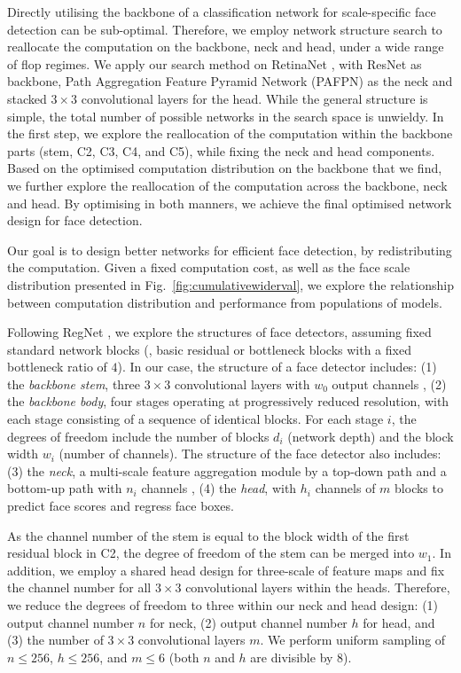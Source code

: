 \documentclass[10pt,twocolumn,letterpaper]{article}
\begin{document}
Directly utilising the backbone of a classification network for scale-specific face detection can be sub-optimal. Therefore, we employ network structure search \cite{radosavovic2020designing} to reallocate the computation on the backbone, neck and head, under a wide range of flop regimes. We apply our search method on RetinaNet \cite{lin2017feature}, with ResNet \cite{he2016deep} as backbone, Path Aggregation Feature Pyramid Network (PAFPN) \cite{liu2018path} as the neck and stacked $3\times3$ convolutional layers for the head. While the general structure is simple, the total number of possible networks in the search space is unwieldy. In the first step, we explore the reallocation of the computation within the backbone parts (\ie stem, C2, C3, C4, and C5), while fixing the neck and head components. Based on the optimised computation distribution on the backbone that we find, we further explore the reallocation of the computation across the backbone, neck and head. By optimising in both manners, we achieve the final optimised network design for face detection.

Our goal is to design better networks for efficient face detection, by redistributing the computation. Given a fixed computation cost, as well as the face scale distribution presented in Fig.~\ref{fig:cumulativewiderval}, we explore the relationship between computation distribution and performance from populations of models. 

Following RegNet \cite{radosavovic2020designing}, we explore the structures of face detectors, assuming fixed standard network blocks (\ie, basic residual or bottleneck blocks with a fixed bottleneck ratio of $4$). In our case, the structure of a face detector includes: (1) the \textit{backbone stem}, three $3\times3$ convolutional layers with $w_0$ output channels \cite{he2019bag}, (2) the \textit{backbone body}, four stages operating at progressively reduced resolution, with each stage consisting of a sequence of identical blocks. For each stage $i$, the degrees of freedom include the number of blocks $d_i$ (\ie network depth) and the block width $w_i$ (\ie number of channels). The structure of the face detector also includes: (3) the \textit{neck}, a multi-scale feature aggregation module by a top-down path and a bottom-up path with $n_i$ channels \cite{liu2018path}, (4) the \textit{head}, with $h_i$ channels of $m$ blocks to predict face scores and regress face boxes. 

As the channel number of the stem is equal to the block width of the first residual block in C2, the degree of freedom of the stem can be merged into $w_1$. In addition, we employ a shared head design for three-scale of feature maps and fix the channel number for all $3\times3$ convolutional layers within the heads. Therefore, we reduce the degrees of freedom to three within our neck and head design: (1) output channel number $n$ for neck, (2) output channel number $h$ for head, and (3) the number of $3\times3$ convolutional layers $m$. We perform uniform sampling of $n \leq 256$, $h\leq 256$, and $m\leq 6$ (both $n$ and $h$ are divisible by 8).
\end{document}
